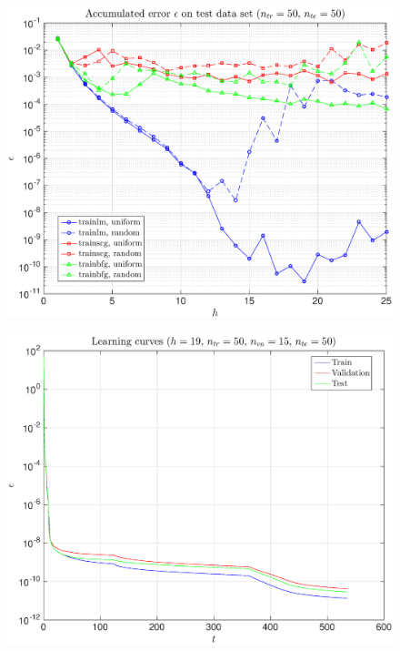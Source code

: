 \documentclass[11pt,a4paper]{article}
\theoremstyle{definition}
\theoremstyle{theorem}
\begin{document}
	\begin{figure}
		\center
		\includegraphics[scale=0.5]{fig11}
		\caption{}
	\end{figure}
	
	\begin{figure}
		\center
		\includegraphics[scale=0.5]{fig12}
		\caption{}
	\end{figure}
	
\end{document}
